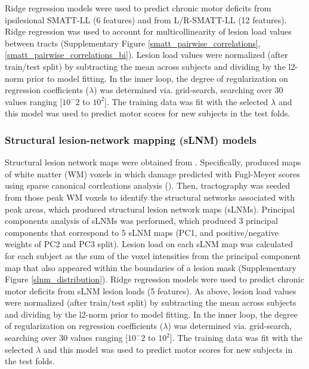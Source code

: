 \documentclass[phd,tocprelim]{cornell}
\begin{document}
Ridge regression models were used to predict chronic motor deficits from ipsilesional SMATT-LL (6 features) and from L/R-SMATT-LL (12 features). Ridge regression was used to account for multicollinearity of lesion load values between tracts (Supplementary Figure \ref{smatt_pairwise_correlations}, \ref{smatt_pairwise_correlations_bi}). Lesion load values were normalized (after train/test split) by subtracting the mean across subjects and dividing by the l2-norm prior to model fitting. In the inner loop, the degree of regularization on regression coefficients ($\lambda$) was determined via. grid-search, searching over 30 values ranging [$10^-2$ to $10^2$]. The training data was fit with the selected $\lambda$ and this model was used to predict motor scores for new subjects in the test folds.

\subsubsection*{Structural lesion-network mapping (sLNM) models}
Structural lesion network maps were obtained from \cite{Bowren2022-rs}. Specifically, \cite{Bowren2022-rs} produced maps of white matter (WM) voxels in which damage predicted with Fugl-Meyer scores using sparse canonical corrleations analysis (\cite{Pustina2018-xv}). Then, tractography was seeded from those peak WM voxels to identify the structural networks associated with peak areas, which produced structural lesion network maps (sLNMs). Principal components analysis of sLNMs was performed, which produced 3 principal components that correspond to 5 sLNM maps (PC1, and positive/negative weights of PC2 and PC3 split). Lesion load on each sLNM map was calculated for each subject as the sum of the voxel intensities from the principal component map that also appeared within the boundaries of a lesion mask (Supplementary Figure \ref{slnm_distribution}). Ridge regression models were used to predict chronic motor deficits from sLNM lesion loads (5 features). As above, lesion load values were normalized (after train/test split) by subtracting the mean across subjects and dividing by the l2-norm prior to model fitting. In the inner loop, the degree of regularization on regression coefficients ($\lambda$) was determined via. grid-search, searching over 30 values ranging [$10^-2$ to $10^2$]. The training data was fit with the selected $\lambda$ and this model was used to predict motor scores for new subjects in the test folds. 
\end{document}
